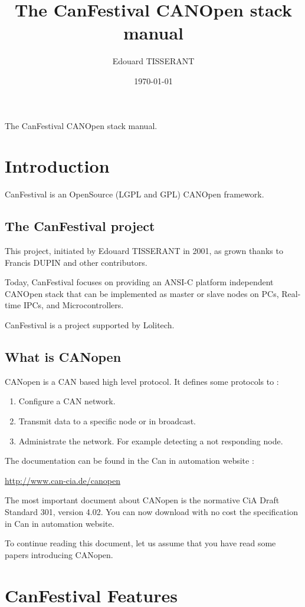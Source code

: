 \documentclass[a4paper,12pt]{book}
\title{\Huge The CanFestival CANOpen stack manual}
\author{Edouard TISSERANT}
\date{\today}
\newcommand\liststyleLi{%
\renewcommand\labelitemi{{--}}
\renewcommand\labelitemii{{--}}
\renewcommand\labelitemiii{{--}}
\renewcommand\labelitemiv{{--}}
}
\begin{document}
{\centering\sffamily\Huge The CanFestival CANOpen stack manual.}

\renewcommand\contentsname{CanFestival v3.0 Manual}
\setcounter{tocdepth}{2}
\tableofcontents
\section{Introduction}
CanFestival is an OpenSource (LGPL and GPL) CANOpen framework.

\subsection{The CanFestival project}
This project, initiated by Edouard TISSERANT in 2001, as grown thanks to
Francis DUPIN and other contributors.

Today, CanFestival focuses on providing an ANSI{}-C platform independent
CANOpen stack that can be implemented as master or slave nodes on PCs,
Real{}-time IPCs, and Microcontrollers.

CanFestival is a project supported by Lolitech.

\subsection{What is CANopen}
CANopen is a CAN based high level protocol. It defines some protocols to
:

\liststyleLi
\begin{enumerate}
\item Configure a CAN network.
\item Transmit data to a specific node or in broadcast.
\item Administrate the network. For example detecting a not responding
node.
\end{enumerate}
The documentation can be found in the Can in automation website :

\href{http://www.can-cia.de/canopen}{http://www.can{}-cia.de/canopen}

The most important document about CANopen is the normative CiA Draft
Standard 301, version 4.02. You can now download with no cost the
specification in Can in automation website.

To continue reading this document, let us assume that you have read some
papers introducing CANopen.

\section{CanFestival Features}
\end{document}
